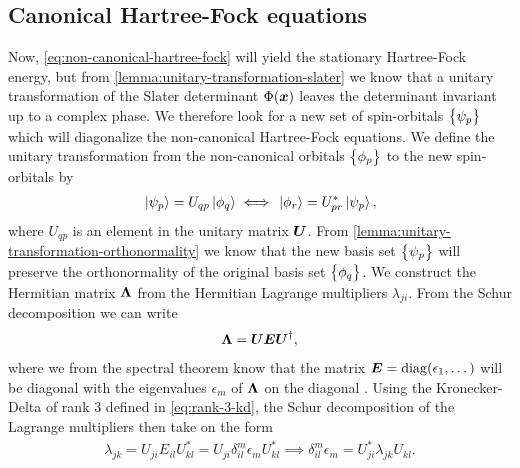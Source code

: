        \subsection{Canonical Hartree-Fock equations}
            Now, \autoref{eq:non-canonical-hartree-fock} will yield the
            stationary Hartree-Fock energy, but from
            \autoref{lemma:unitary-transformation-slater} we know that a unitary
            transformation of the Slater determinant $\Phi(\boldsymbol{x})$ leaves the
            determinant invariant up to a complex phase.
            We therefore look for a new set of spin-orbitals $\left\{ \psi_p \right\}$
            which will diagonalize the non-canonical Hartree-Fock equations.
            We define the unitary transformation from the non-canonical orbitals
            $\left\{ \phi_p \right\}$ to the new spin-orbitals by
            \begin{align}
                \ket*{\psi_p} = U_{qp}\ket*{\phi_q}
                \iff
                \ket*{\phi_r} = U^{*}_{pr}\ket*{\psi_p},
            \end{align}
            where $U_{qp}$ is an element in the unitary matrix $\boldsymbol{U}$.
            From \autoref{lemma:unitary-transformation-orthonormality} we know
            that the new basis set $\left\{ \psi_{p} \right\}$ will preserve the
            orthonormality of the original basis set $\left\{ \phi_q \right\}$.
            We construct the Hermitian matrix $\boldsymbol{\Lambda}$ from the Hermitian
            Lagrange multipliers $\lambda_{ji}$.
            From the Schur decomposition \cite{mat-inf4130} we can write
            \begin{align}
                \boldsymbol{\Lambda} = \boldsymbol{U} \boldsymbol{E} \boldsymbol{U}^{\dagger},
            \end{align}
            where we from the spectral theorem know that the matrix
            $\boldsymbol{E} = \operatorname{diag}(\epsilon_1, \dots)$ will be diagonal with the
            eigenvalues $\epsilon_m$ of $\boldsymbol{\Lambda}$ on the diagonal
            \cite{mat-inf4130}.
            Using the Kronecker-Delta of rank 3 defined in
            \autoref{eq:rank-3-kd}, the Schur decomposition of the Lagrange
            multipliers then take on the form
            \begin{align}
                \lambda_{jk} = U_{ji} E_{il} U^{*}_{kl}
                = U_{ji} \delta^{m}_{il} \epsilon_m U^{*}_{kl}
                \implies
                \delta^{m}_{il} \epsilon_m
                = U^{*}_{ji} \lambda_{jk} U_{kl}.
            \end{align}
